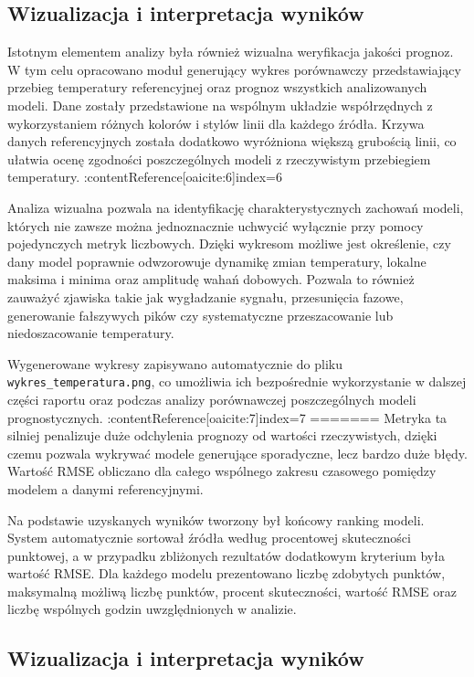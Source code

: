 \documentclass[a4paper,12pt]{article}
\begin{document}
\subsection{Wizualizacja i interpretacja wyników}

Istotnym elementem analizy była również wizualna weryfikacja jakości prognoz. W tym celu opracowano moduł generujący wykres porównawczy przedstawiający przebieg temperatury referencyjnej oraz prognoz wszystkich analizowanych modeli. Dane zostały przedstawione na wspólnym układzie współrzędnych z wykorzystaniem różnych kolorów i stylów linii dla każdego źródła. Krzywa danych referencyjnych została dodatkowo wyróżniona większą grubością linii, co ułatwia ocenę zgodności poszczególnych modeli z rzeczywistym przebiegiem temperatury. :contentReference[oaicite:6]{index=6}

Analiza wizualna pozwala na identyfikację charakterystycznych zachowań modeli, których nie zawsze można jednoznacznie uchwycić wyłącznie przy pomocy pojedynczych metryk liczbowych. Dzięki wykresom możliwe jest określenie, czy dany model poprawnie odwzorowuje dynamikę zmian temperatury, lokalne maksima i minima oraz amplitudę wahań dobowych. Pozwala to również zauważyć zjawiska takie jak wygładzanie sygnału, przesunięcia fazowe, generowanie fałszywych pików czy systematyczne przeszacowanie lub niedoszacowanie temperatury.

Wygenerowane wykresy zapisywano automatycznie do pliku \texttt{wykres\_temperatura.png}, co umożliwia ich bezpośrednie wykorzystanie w dalszej części raportu oraz podczas analizy porównawczej poszczególnych modeli prognostycznych. :contentReference[oaicite:7]{index=7}
=======
\noindent
Metryka ta silniej penalizuje duże odchylenia prognozy od wartości rzeczywistych, dzięki czemu pozwala wykrywać modele generujące sporadyczne, lecz bardzo duże błędy. Wartość RMSE obliczano dla całego wspólnego zakresu czasowego pomiędzy modelem a danymi referencyjnymi. 

\noindent
Na podstawie uzyskanych wyników tworzony był końcowy ranking modeli. System automatycznie sortował źródła według procentowej skuteczności punktowej, a w przypadku zbliżonych rezultatów dodatkowym kryterium była wartość RMSE. Dla każdego modelu prezentowano liczbę zdobytych punktów, maksymalną możliwą liczbę punktów, procent skuteczności, wartość RMSE oraz liczbę wspólnych godzin uwzględnionych w analizie. 

\subsection{Wizualizacja i interpretacja wyników}
\end{document}

